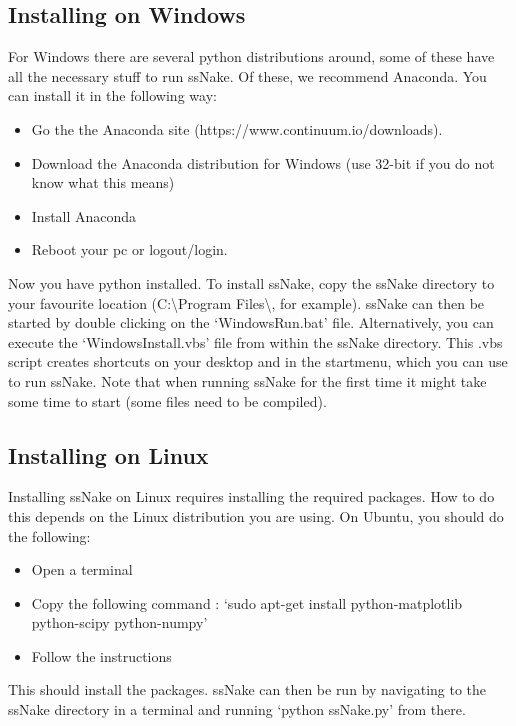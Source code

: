 \documentclass[11pt,a4paper]{article}
\begin{document}
\subsection{Installing on Windows}
For Windows there are several python distributions around, some of these have all the necessary stuff to run ssNake. Of these, we recommend Anaconda. You can install it in the following way:
\begin{itemize}
\item Go the the Anaconda site (https://www.continuum.io/downloads).
\item Download the Anaconda distribution for Windows (use 32-bit if you do not know what this means)
\item Install Anaconda
\item Reboot your pc or logout/login.
\end{itemize}
Now you have python installed. To install ssNake, copy the ssNake directory to your favourite location (C:\textbackslash{}Program Files\textbackslash{}, for example). ssNake can then be started by double clicking on the `WindowsRun.bat' file. Alternatively, you can execute the `WindowsInstall.vbs' file from within the ssNake directory. This .vbs script creates shortcuts on your desktop and in the startmenu, which you can use to run ssNake. Note that when running ssNake for the first time it might take some time to start (some files need to be compiled).

\subsection{Installing on Linux}
Installing ssNake on Linux requires installing the required packages. How to do this depends on the Linux distribution you are using. On Ubuntu, you should do the following:
\begin{itemize}
\item Open a terminal
\item Copy the following command : `sudo apt-get install python-matplotlib python-scipy python-numpy'
\item Follow the instructions
\end{itemize}
This should install the packages. ssNake can then be run by navigating to the ssNake directory in a terminal and running `python ssNake.py' from there.
\end{document}

